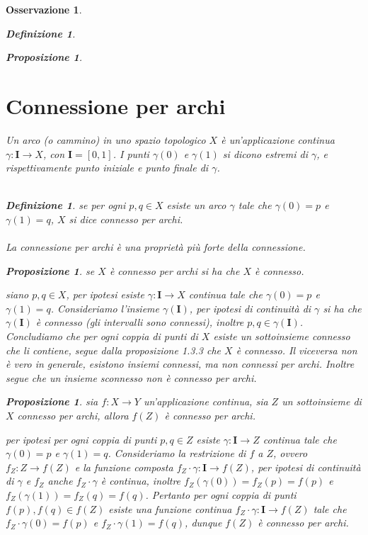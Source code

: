 \documentclass[oneside, 11pt]{amsbook}
\makeatletter
\newcommand{\0}{{(0)}}
\newcommand{\3}{{(3)}}
\theoremstyle{colonplain}
\newtheorem{prop}[thm]{Proposizione}
\theoremstyle{colondefinition}
\newtheorem{defn}[thm]{Definizione}
\theoremstyle{colonremark}
\newtheorem{rmk}[thm]{Osservazione}
\numberwithin{equation}{chapter}
\renewcommand{\proofname}{Dimostrazione}
\renewenvironment{proof}[1][\proofname]{\par
  \pushQED{\end{proof}}%
  \normalfont \topsep6\p@\@plus6\p@\relax
  \trivlist
  \item[\hskip\labelsep\bfseries #1:]\ignorespaces
}{%
  \popQED\endtrivlist\@endpefalse
}
\makeatother
\begin{document}
\begin{rmk}
\begin{defn}
\begin{prop}
\section{Connessione per archi}
Un \textit{arco} (o \textit{cammino}) in uno spazio topologico $X$ è un'applicazione continua $\gamma : \mathbf{I} \longrightarrow X$, con $\mathbf{I} = [0, 1]$. I punti $\gamma(0)$ e $\gamma(1)$ si dicono \textit{estremi} di $\gamma$, e rispettivamente \textit{punto iniziale} e \textit{punto finale} di $\gamma$. \\ \\
\begin{defn}
se per ogni $p, q \in X$ esiste un arco $\gamma$ tale che $\gamma(0) = p$ e $\gamma(1) = q$, $X$ si dice \textit{connesso per archi}. \\ \\
La connessione per archi è una proprietà più forte della connessione.
\end{defn}
\begin{prop}
se $X$ è connesso per archi si ha che $X$ è connesso.
\end{prop}
\begin{proof}
siano $p, q \in X$, per ipotesi esiste $\gamma : \mathbf{I} \longrightarrow X$ continua tale che $\gamma(0) = p$ e $\gamma(1) = q$. Consideriamo l'insieme $\gamma(\mathbf{I})$, per ipotesi di continuità di $\gamma$ si ha che $\gamma(\mathbf{I})$ è connesso (gli intervalli sono connessi), inoltre $p, q \in \gamma(\mathbf{I})$. Concludiamo che per ogni coppia di punti di $X$ esiste un sottoinsieme connesso che li contiene, segue dalla \textit{proposizione 1.3.3} che $X$ è connesso.
\end{proof}
Il viceversa non è vero in generale, esistono insiemi connessi, ma non connessi per archi. Inoltre segue che un insieme sconnesso non è connesso per archi.
\begin{prop}
sia $f : X \longrightarrow Y$ un'applicazione continua, sia $Z$ un sottoinsieme di $X$ connesso per archi, allora $f(Z)$ è connesso per archi.
\end{prop}
\begin{proof}
per ipotesi per ogni coppia di punti $p, q \in Z$ esiste $\gamma : \mathbf{I} \longrightarrow Z$ continua tale che $\gamma(0) = p$ e $\gamma(1) = q$. Consideriamo la restrizione di $f$ a $Z$, ovvero $f_Z : Z \longrightarrow f(Z)$ e la funzione composta $f_Z \cdot \gamma : \mathbf{I} \longrightarrow f(Z)$, per ipotesi di continuità di $\gamma$ e $f_Z$ anche $f_Z \cdot \gamma$ è continua, inoltre $f_Z(\gamma(0)) = f_Z(p) = f(p)$ e $f_Z(\gamma(1)) = f_Z(q) = f(q)$. Pertanto per ogni coppia di punti $f(p), f(q) \in f(Z)$ esiste una funzione continua $f_Z \cdot \gamma : \mathbf{I} \longrightarrow f(Z)$ tale che $f_Z \cdot \gamma (0) = f(p)$ e $f_Z \cdot \gamma (1) = f(q)$, dunque $f(Z)$ è connesso per archi.

\end{proof}
\end{prop}
\end{defn}
\end{rmk}
\end{document}
